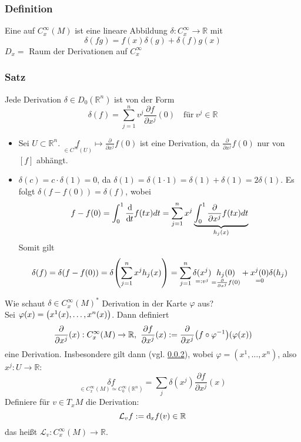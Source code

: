 \subsubsection{Definition}
\label{ssub:148}
Eine  auf $C_x^\infty (M)$ ist eine lineare Abbildung $\delta: C_x^\infty \to \mathds{R}$ mit 
\[
\delta(fg) = f(x)\delta(g) + \delta(f)g(x) \tag{Leibnitz-Regel}
\]
$D_x =$ Raum der Derivationen auf $C_x^\infty$ 

\subsubsection{Satz}
\label{ssub:149}
Jede Derivation $\delta \in D_0(\mathds{R}^n)$ ist von der Form
\[
\delta(f) = \sum_{j=1}^n v^j \frac{\partial f}{\partial x^j}(0)\quad \text{für}\ v^j\in \mathds{R}
\]
\begin{itemize}
\item Sei $U\subset \mathds{R}^n$. $\underset{\in C^\infty(U)}{f}	 \mapsto \frac{\partial}{\partial x^j}f(0)$ ist eine Derivation, da $\frac{\partial}{\partial x^j} f(0)$ nur von $[f]$ abhängt.
\item 
{}
$\delta(c) = c\cdot \delta(1) = 0$, da $\delta(1) = \delta(1\cdot 1) = \delta(1) + \delta(1) = 2\delta(1)$. Es folgt $\delta(f-f(0)) = \delta(f)$, wobei
\[
f-f(0) = \int_0^1 \frac{\mathd}{\mathd t} f(tx) dt = \sum_{j=1}^n x^j \underbrace{\int_0^1 \frac{\partial}{\partial x^j} f(tx) dt}_{h_j(x)}
\]
Somit gilt
\[
\delta(f) = \delta(f-f(0)) = \delta\enbrace*{\sum_{j=1}^n x^j h_j(x)} = \sum_{j=1}^n \underset{=: v^j}{\delta(x^j)} \underset{= \frac{\partial}{\partial x^j}f(0)}{h_j(0)} + \underset{=0}{x^j(0)} \delta(h_j)
\]
\end{itemize}

Wie schaut $\delta\in C_x^\infty (M)^*$ Derivation in der Karte $\varphi$ aus?
\\
Sei $\varphi(x) = \enbrace*{x^1(x),\ldots, x^n(x)}$. Dann definiert
\[
\frac{\partial}{\partial x^j}(x): C^\infty_x (M) \to \mathds{R},\ \frac{\partial f}{\partial x^j}(x) := \frac{\partial}{\partial x^j}\enbrace*{f\circ \varphi^{-1}}\enbrace*{\varphi(x)}
\]
eine Derivation.
Insbesondere gilt dann (vgl. \ref{ssub:149}), wobei $\varphi = (x^1,\ldots,x^n)$, also $x^j:U\to \mathds{R}$:
\[
\underset{\in C^\infty_x (M) \simeq C^\infty_0 (\mathds{R}^n)}{\delta f} = \sum_j \delta(x^j) \frac{\partial f}{\partial x^j}(x)
\]
Definiere für $v\in T_x M$ die Derivation:
\[
\mathcal{L}_v f := \mathd_x f(v) \in \mathds{R}
\]
das heißt $\mathcal{L}_v: C^\infty_x (M) \to \mathds{R}$.

